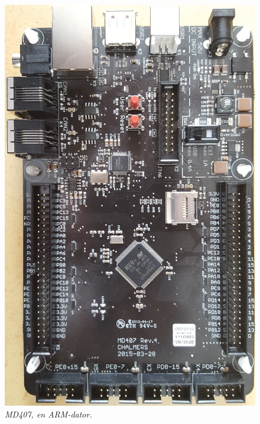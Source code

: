 \documentclass[a4paper]{article}
\begin{document}
\begin{figure}[H]
\includegraphics[scale=0.03]{MD407.jpg} \hspace{2mm}
\centering
\caption{\it MD407, en ARM-dator.}
\end{figure} 

\end{document}
